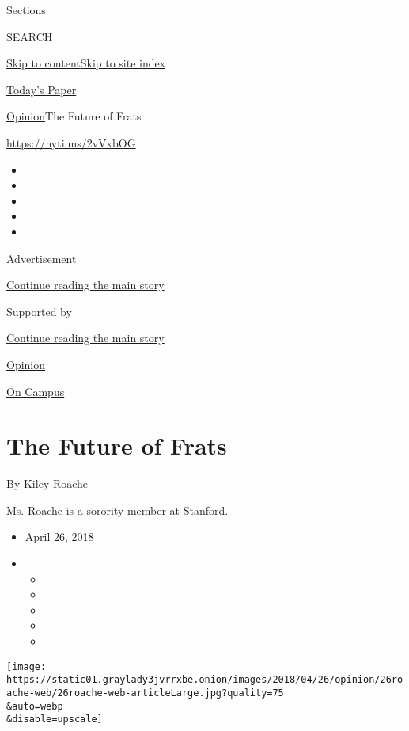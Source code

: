 Sections

SEARCH

\protect\hyperlink{site-content}{Skip to
content}\protect\hyperlink{site-index}{Skip to site index}

\href{https://myaccount.nytimes3xbfgragh.onion/auth/login?response_type=cookie\&client_id=vi}{}

\href{https://www.nytimes3xbfgragh.onion/section/todayspaper}{Today's
Paper}

\href{/section/opinion}{Opinion}\textbar{}The Future of Frats

\url{https://nyti.ms/2vVxbOG}

\begin{itemize}
\item
\item
\item
\item
\item
\end{itemize}

Advertisement

\protect\hyperlink{after-top}{Continue reading the main story}

Supported by

\protect\hyperlink{after-sponsor}{Continue reading the main story}

\href{/section/opinion}{Opinion}

\href{/column/on-campus}{On Campus}

\hypertarget{the-future-of-frats}{%
\section{The Future of Frats}\label{the-future-of-frats}}

By Kiley Roache

Ms. Roache is a sorority member at Stanford.

\begin{itemize}
\item
  April 26, 2018
\item
  \begin{itemize}
  \item
  \item
  \item
  \item
  \item
  \end{itemize}
\end{itemize}

\texttt{[image: https://static01.graylady3jvrrxbe.onion/images/2018/04/26/opinion/26roache-web/26roache-web-articleLarge.jpg?quality=75\\\&auto=webp\\\&disable=upscale]}

